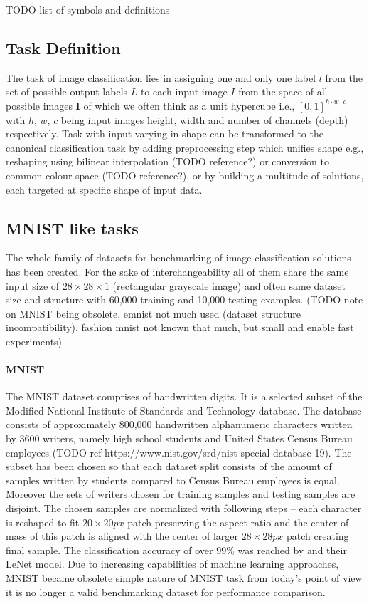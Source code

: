 TODO list of symbols and definitions

\subsection{Task Definition}
The task of image classification lies in assigning one and only one label $l$ from the set of possible output labels $L$ to each input image $I$ from the space of all possible images $\mathbf{I}$ of which we often think as a unit hypercube i.e., $[0,1]^{h \cdot w \cdot c}$ with $h$, $w$, $c$ being input images height, width and number of channels (depth) respectively. Task with input varying in shape can be transformed to the canonical classification task by adding preprocessing step which unifies shape e.g., reshaping using bilinear interpolation (TODO reference?) or conversion to common colour space (TODO reference?), or by building a multitude of solutions, each targeted at specific shape of input data.

\subsection{MNIST like tasks}
The whole family of datasets for benchmarking of image classification solutions has been created. For the sake of interchangeability all of them share the same input size of $28 \times 28 \times 1$ (rectangular grayscale image) and often same dataset size and structure with 60,000 training and 10,000 testing examples. (TODO note on MNIST being obsolete, emnist not much used (dataset structure incompatibility), fashion mnist not known that much, but small and enable fast experiments)

\paragraph{MNIST}

The MNIST dataset comprises of handwritten digits. It is a selected subset of the Modified National Institute of Standards and Technology database. The database consists of approximately 800,000 handwritten alphanumeric characters written by 3600 writers, namely high school students and United States Census Bureau employees (TODO ref https://www.nist.gov/srd/nist-special-database-19). The subset has been chosen so that each dataset split consists of the amount of samples written by students compared to Census Bureau employees is equal. Moreover the sets of writers chosen for training samples and testing samples are disjoint. The chosen samples are normalized with following steps -- each character is reshaped to fit $20 \times 20px$ patch preserving the aspect ratio and the center of mass of this patch is aligned with the center of larger $28 \times 28px$ patch creating final sample. The classification accuracy of over 99\% was reached by \cite{Lecun98gradient-basedlearning} and their LeNet model. Due to increasing capabilities of machine learning approaches, MNIST became obsolete simple nature of MNIST task from today's point of view it is no longer a valid benchmarking dataset for performance comparison.

